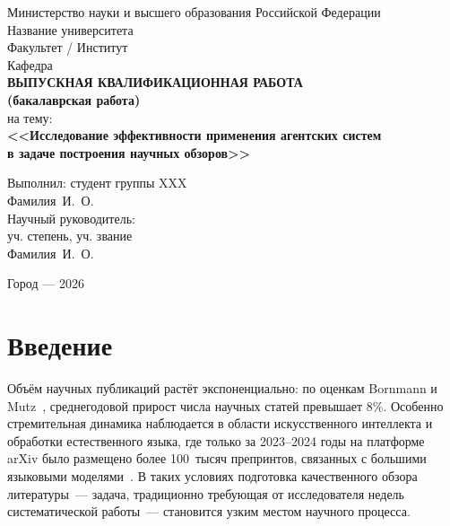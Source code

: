 \documentclass[a4paper,14pt]{extarticle}
\begin{document}
\begin{titlepage}
\begin{center}
\vspace*{2cm}
{\large Министерство науки и высшего образования Российской Федерации}\\[0.5cm]
{\large Название университета}\\[0.5cm]
{\large Факультет / Институт}\\[0.5cm]
{\large Кафедра}\\[3cm]

{\Large\bfseries ВЫПУСКНАЯ КВАЛИФИКАЦИОННАЯ РАБОТА\\[0.3cm]
(бакалаврская работа)}\\[1.5cm]

{\large на тему:}\\[0.5cm]
{\Large\bfseries <<Исследование эффективности применения агентских систем\\
в задаче построения научных обзоров>>}\\[3cm]

\begin{flushright}
Выполнил: студент группы XXX\\
Фамилия~И.~О.\\[0.5cm]
Научный руководитель:\\
уч. степень, уч. звание\\
Фамилия~И.~О.
\end{flushright}

\vfill
{\large Город --- 2026}
\end{center}
\end{titlepage}

\tableofcontents
\newpage

\section*{Введение}

Объём научных публикаций растёт экспоненциально: по оценкам Bornmann и Mutz~\cite{bornmann2015growth}, среднегодовой прирост числа научных статей превышает 8\%.  Особенно стремительная динамика наблюдается в области искусственного интеллекта и обработки естественного языка, где только за 2023--2024 годы на платформе arXiv было размещено более 100~тысяч препринтов, связанных с большими языковыми моделями~\cite{wang2024autosurvey}. В таких условиях подготовка качественного обзора литературы~--- задача, традиционно требующая от исследователя недель систематической работы~--- становится узким местом научного процесса.
\end{document}
